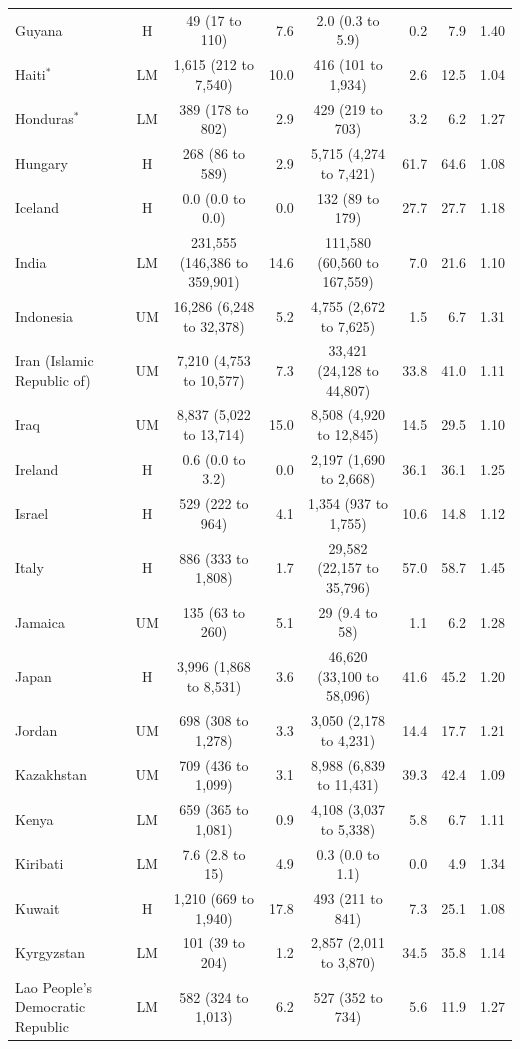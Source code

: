 \begin{longtable}{lccrcrrr}
Guyana & H & 49 (17 to 110) & 7.6 & 2.0 (0.3 to 5.9) & 0.2 & 7.9 & 1.40 \\
Haiti$^{*}$ & LM & 1,615 (212 to 7,540) & 10.0 & 416 (101 to 1,934) & 2.6 & 12.5 & 1.04 \\
Honduras$^{*}$ & LM & 389 (178 to 802) & 2.9 & 429 (219 to 703) & 3.2 & 6.2 & 1.27 \\
Hungary & H & 268 (86 to 589) & 2.9 & 5,715 (4,274 to 7,421) & 61.7 & 64.6 & 1.08 \\
Iceland & H & 0.0 (0.0 to 0.0) & 0.0 & 132 (89 to 179) & 27.7 & 27.7 & 1.18 \\
India & LM & 231,555 (146,386 to 359,901) & 14.6 & 111,580 (60,560 to 167,559) & 7.0 & 21.6 & 1.10 \\
Indonesia & UM & 16,286 (6,248 to 32,378) & 5.2 & 4,755 (2,672 to 7,625) & 1.5 & 6.7 & 1.31 \\
Iran (Islamic Republic of) & UM & 7,210 (4,753 to 10,577) & 7.3 & 33,421 (24,128 to 44,807) & 33.8 & 41.0 & 1.11 \\
Iraq & UM & 8,837 (5,022 to 13,714) & 15.0 & 8,508 (4,920 to 12,845) & 14.5 & 29.5 & 1.10 \\
Ireland & H & 0.6 (0.0 to 3.2) & 0.0 & 2,197 (1,690 to 2,668) & 36.1 & 36.1 & 1.25 \\
Israel & H & 529 (222 to 964) & 4.1 & 1,354 (937 to 1,755) & 10.6 & 14.8 & 1.12 \\
Italy & H & 886 (333 to 1,808) & 1.7 & 29,582 (22,157 to 35,796) & 57.0 & 58.7 & 1.45 \\
Jamaica & UM & 135 (63 to 260) & 5.1 & 29 (9.4 to 58) & 1.1 & 6.2 & 1.28 \\
Japan & H & 3,996 (1,868 to 8,531) & 3.6 & 46,620 (33,100 to 58,096) & 41.6 & 45.2 & 1.20 \\
Jordan & UM & 698 (308 to 1,278) & 3.3 & 3,050 (2,178 to 4,231) & 14.4 & 17.7 & 1.21 \\
Kazakhstan & UM & 709 (436 to 1,099) & 3.1 & 8,988 (6,839 to 11,431) & 39.3 & 42.4 & 1.09 \\
Kenya & LM & 659 (365 to 1,081) & 0.9 & 4,108 (3,037 to 5,338) & 5.8 & 6.7 & 1.11 \\
Kiribati & LM & 7.6 (2.8 to 15) & 4.9 & 0.3 (0.0 to 1.1) & 0.0 & 4.9 & 1.34 \\
Kuwait & H & 1,210 (669 to 1,940) & 17.8 & 493 (211 to 841) & 7.3 & 25.1 & 1.08 \\
Kyrgyzstan & LM & 101 (39 to 204) & 1.2 & 2,857 (2,011 to 3,870) & 34.5 & 35.8 & 1.14 \\
Lao People's Democratic Republic & LM & 582 (324 to 1,013) & 6.2 & 527 (352 to 734) & 5.6 & 11.9 & 1.27 \\

\end{longtable}
